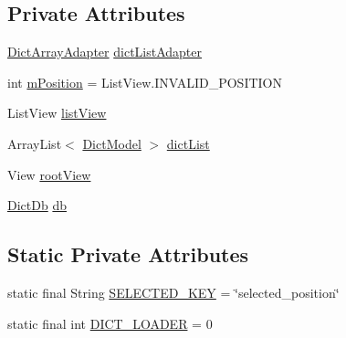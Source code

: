 \subsection*{Private Attributes}
\begin{DoxyCompactItemize}
\item 
\hyperlink{classorg_1_1buildmlearn_1_1toolkit_1_1dictationtemplate_1_1adapter_1_1DictArrayAdapter}{Dict\+Array\+Adapter} \hyperlink{classorg_1_1buildmlearn_1_1toolkit_1_1dictationtemplate_1_1fragment_1_1MainActivityFragment_aa862ad0c92de4d75fef103de22526e14}{dict\+List\+Adapter}
\item 
int \hyperlink{classorg_1_1buildmlearn_1_1toolkit_1_1dictationtemplate_1_1fragment_1_1MainActivityFragment_ac82334513aeeb2801d71c40978131fd5}{m\+Position} = List\+View.\+I\+N\+V\+A\+L\+I\+D\+\_\+\+P\+O\+S\+I\+T\+I\+ON
\item 
List\+View \hyperlink{classorg_1_1buildmlearn_1_1toolkit_1_1dictationtemplate_1_1fragment_1_1MainActivityFragment_a55fda03ccf27a05410acac4a71809aad}{list\+View}
\item 
Array\+List$<$ \hyperlink{classorg_1_1buildmlearn_1_1toolkit_1_1dictationtemplate_1_1data_1_1DictModel}{Dict\+Model} $>$ \hyperlink{classorg_1_1buildmlearn_1_1toolkit_1_1dictationtemplate_1_1fragment_1_1MainActivityFragment_a6deff48b5ad694dea43dd1dbdd304e98}{dict\+List}
\item 
View \hyperlink{classorg_1_1buildmlearn_1_1toolkit_1_1dictationtemplate_1_1fragment_1_1MainActivityFragment_a4c87f9970fc336a7eb56e455167731ae}{root\+View}
\item 
\hyperlink{classorg_1_1buildmlearn_1_1toolkit_1_1dictationtemplate_1_1data_1_1DictDb}{Dict\+Db} \hyperlink{classorg_1_1buildmlearn_1_1toolkit_1_1dictationtemplate_1_1fragment_1_1MainActivityFragment_a175afff0ad046a37216c8aed13e4d89f}{db}
\end{DoxyCompactItemize}
\subsection*{Static Private Attributes}
\begin{DoxyCompactItemize}
\item 
static final String \hyperlink{classorg_1_1buildmlearn_1_1toolkit_1_1dictationtemplate_1_1fragment_1_1MainActivityFragment_a3ea745d0af973fba04b0f88338e7806b}{S\+E\+L\+E\+C\+T\+E\+D\+\_\+\+K\+EY} = \char`\"{}selected\+\_\+position\char`\"{}
\item 
static final int \hyperlink{classorg_1_1buildmlearn_1_1toolkit_1_1dictationtemplate_1_1fragment_1_1MainActivityFragment_a46fabca2ae567cec94b550d007ed305d}{D\+I\+C\+T\+\_\+\+L\+O\+A\+D\+ER} = 0
\end{DoxyCompactItemize}


